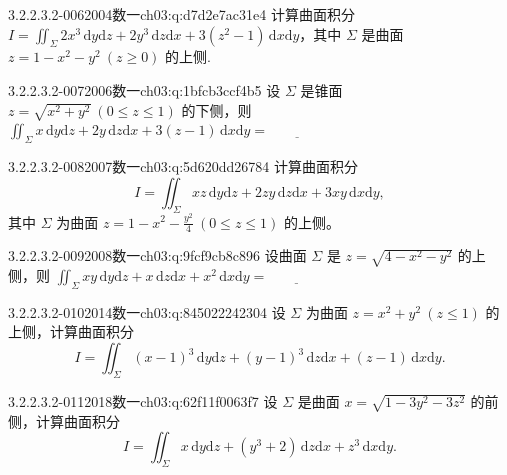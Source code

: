 \begin{q}{3.2.2.3.2-006}{2004数一}{ch03:q:d7d2e7ac31e4}
计算曲面积分 $\displaystyle I=\iint_{\Sigma} 2x^3\,\mathrm{d}y\mathrm{d}z+2y^3\,\mathrm{d}z\mathrm{d}x+3(z^2-1)\,\mathrm{d}x\mathrm{d}y$，其中 $\Sigma$ 是曲面 $z=1-x^2-y^2\ (z\geqslant 0)$ 的上侧.
\end{q}

\begin{q}{3.2.2.3.2-007}{2006数一}{ch03:q:1bfcb3ccf4b5}
设 $\Sigma$ 是锥面 $z=\sqrt{x^2+y^2}\ (0\leqslant z\leqslant 1)$ 的下侧，则 $\displaystyle\iint_{\Sigma} x\,\mathrm{d}y\mathrm{d}z+2y\,\mathrm{d}z\mathrm{d}x+3(z-1)\,\mathrm{d}x\mathrm{d}y=\underline{\hspace{4em}}$
\end{q}

\begin{q}{3.2.2.3.2-008}{2007数一}{ch03:q:5d620dd26784}
计算曲面积分
\[
I=\iint_{\Sigma} xz\,\mathrm{d}y\mathrm{d}z+2zy\,\mathrm{d}z\mathrm{d}x+3xy\,\mathrm{d}x\mathrm{d}y,
\]
其中 $\Sigma$ 为曲面 $z=1-x^2-\frac{y^2}{4}\ (0\leqslant z\leqslant 1)$ 的上侧。
\end{q}

\begin{q}{3.2.2.3.2-009}{2008数一}{ch03:q:9fcf9cb8c896}
设曲面 $\Sigma$ 是 $z=\sqrt{4-x^{2}-y^{2}}$ 的上侧，则
$\displaystyle \iint_{\Sigma} xy\,\mathrm{d}y\mathrm{d}z + x\,\mathrm{d}z\mathrm{d}x + x^{2}\,\mathrm{d}x\mathrm{d}y = \underline{\hspace{4em}}$
\end{q}

\begin{q}{3.2.2.3.2-010}{2014数一}{ch03:q:845022242304}
设 $\Sigma$ 为曲面 $z=x^2+y^2\ (z\leqslant 1)$ 的上侧，计算曲面积分
\[I=\iint_{\Sigma}(x-1)^3\,\mathrm{d}y\mathrm{d}z+(y-1)^3\,\mathrm{d}z\mathrm{d}x+(z-1)\,\mathrm{d}x\mathrm{d}y.\]
\end{q}

\begin{q}{3.2.2.3.2-011}{2018数一}{ch03:q:62f11f0063f7}
设 $\Sigma$ 是曲面 $x=\sqrt{1-3y^{2}-3z^{2}}$ 的前侧，计算曲面积分 \[I=\iint_{\Sigma} x\,\mathrm{d}y\mathrm{d}z+(y^{3}+2)\,\mathrm{d}z\mathrm{d}x+z^{3}\,\mathrm{d}x\mathrm{d}y.\]
\end{q}

